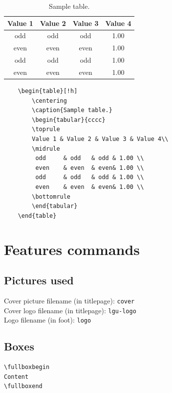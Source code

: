 \documentclass[12pt]{article}
\begin{document}
\begin{table}[!h]
\centering
\caption{Sample table.}
\begin{tabular}{cccc}
\toprule
Value 1 & Value 2 & Value 3 & Value 4\\
\midrule
 odd     & odd   & odd & 1.00 \\
 even    & even  & even& 1.00 \\
 odd     & odd   & odd & 1.00 \\
 even    & even  & even& 1.00 \\
\bottomrule
\end{tabular}
\end{table}

\begin{verbatim}
    \begin{table}[!h]
        \centering
        \caption{Sample table.}
        \begin{tabular}{cccc}
        \toprule
        Value 1 & Value 2 & Value 3 & Value 4\\
        \midrule
         odd     & odd   & odd & 1.00 \\
         even    & even  & even& 1.00 \\
         odd     & odd   & odd & 1.00 \\
         even    & even  & even& 1.00 \\
        \bottomrule
        \end{tabular}
    \end{table}
\end{verbatim}

\section{Features commands}

\subsection{Pictures used}

\noindent
Cover picture filename (in titlepage): \texttt{cover}\\
Cover logo filename (in titlepage): \texttt{lgu-logo}\\
Logo filename (in foot): \texttt{logo}

\subsection{Boxes}

\begin{verbatim}
\fullboxbegin
Content
\fullboxend
\end{verbatim}
\end{document}
